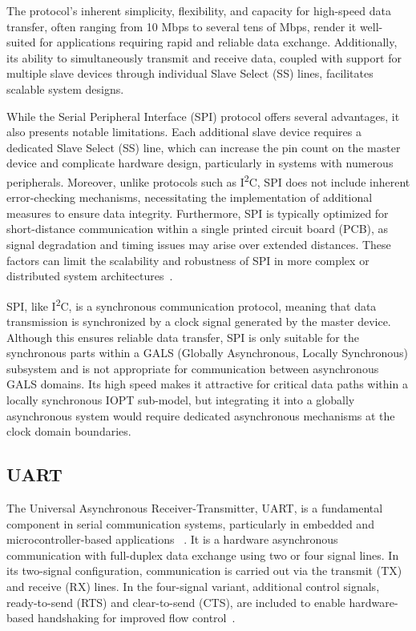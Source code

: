 The protocol’s inherent simplicity, flexibility, and capacity for high-speed data transfer, often ranging from 10 Mbps to several tens of Mbps, render it well-suited for applications requiring rapid and reliable data exchange. Additionally, its ability to simultaneously transmit and receive data, coupled with support for multiple slave devices through individual Slave Select (SS) lines, facilitates scalable system designs.

While the Serial Peripheral Interface (SPI) protocol offers several advantages, it also presents notable limitations. Each additional slave device requires a dedicated Slave Select (SS) line, which can increase the pin count on the master device and complicate hardware design, particularly in systems with numerous peripherals. Moreover, unlike protocols such as  I\textsuperscript{2}C, SPI does not include inherent error-checking mechanisms, necessitating the implementation of additional measures to ensure data integrity. Furthermore, SPI is typically optimized for short-distance communication within a single printed circuit board (PCB), as signal degradation and timing issues may arise over extended distances. These factors can limit the scalability and robustness of SPI in more complex or distributed system architectures~\cite{spisite2}.


SPI, like I\textsuperscript{2}C, is a synchronous communication protocol, meaning that data transmission is synchronized by a clock signal generated by the master device. Although this ensures reliable data transfer, SPI is only suitable for the synchronous parts within a GALS (Globally Asynchronous, Locally Synchronous) subsystem and is not appropriate for communication between asynchronous GALS domains. Its high speed makes it attractive for critical data paths within a locally synchronous IOPT sub-model, but integrating it into a globally asynchronous system would require dedicated asynchronous mechanisms at the clock domain boundaries.

\subsection{UART}
\label{sub:uart}

The Universal Asynchronous Receiver-Transmitter, UART, is a fundamental component in serial communication systems, particularly in embedded and microcontroller-based applications ~\cite{UARTwiki}. It is a hardware asynchronous communication with full-duplex data exchange using two or four signal lines. In its two-signal configuration, communication is carried out via the transmit (TX) and receive (RX) lines. In the four-signal variant, additional control signals, ready-to-send (RTS) and clear-to-send (CTS), are included to enable hardware-based handshaking for improved flow control~\cite{Rao2021}.

